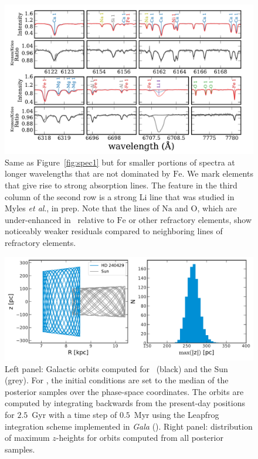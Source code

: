 \documentclass[12pt,letterpaper,margin=1in]{article}
\newcommand{\project}[1]{\textsl{#1}}
\newcommand{\figname}{Figure}
\newcommand{\etal}{\textit{et al}.}
\newcommand*\elem[1]{\ensuremath{\mathrm{#1}}}
\newcommand{\sunanalog}{\text{Krios}}
\newcommand{\bizarreone}{\text{Kronos}}
\begin{document}
\begin{figure}[htpb]
  \centering
  \includegraphics[width=0.95\linewidth]{spec2.pdf}
  \caption{Same as \figname~\ref{fig:spec1}
    but for smaller portions of spectra at longer wavelengths that are
    not dominated by \elem{Fe}.
    We mark elements that give rise to strong absorption lines.
    The feature in the third column of the second row is a strong \elem{Li}
    line that was studied in Myles \etal, in prep.
    Note that the lines of \elem{Na} and \elem{O}, which are under-enhanced
    in \bizarreone\ relative to \elem{Fe} or other refractory elements,
    show noticeably weaker residuals compared to neighboring lines of
    refractory elements.
  }
  \label{fig:spec2}
\end{figure}

\begin{figure}[htbp]
  \begin{center}
    \includegraphics[width=\linewidth]{orbits.pdf}
  \end{center}
  \caption{Left panel: Galactic orbits computed for \sunanalog\ (black) and the
    Sun (grey).
    For \sunanalog, the initial conditions are set to the median of the
    posterior samples over the phase-space coordinates.
    The orbits are computed by integrating backwards from the present-day
    positions for $2.5$~Gyr with a time step of $0.5$~Myr using the Leapfrog
    integration scheme implemented in \project{Gala} (\citealt{gala}).
    Right panel: distribution of maximum $z$-heights for orbits computed from
    all posterior samples.
  }
  \label{fig:orbit}
\end{figure}
\end{document}
